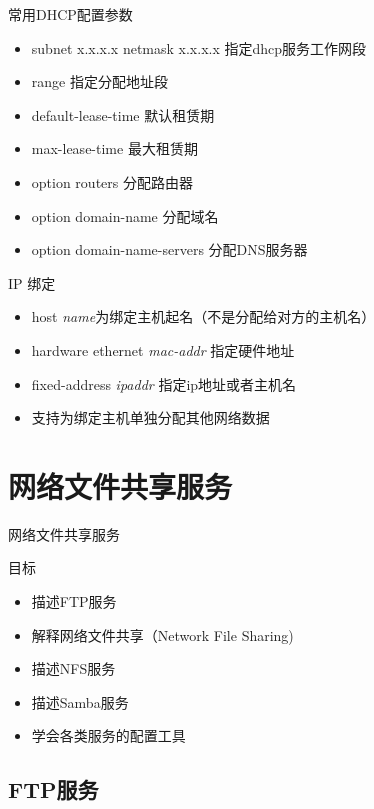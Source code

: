 \begin{frame}{常用DHCP配置参数}
\begin{itemize}
\item subnet x.x.x.x netmask x.x.x.x 指定dhcp服务工作网段
\item range 指定分配地址段
\item default-lease-time 默认租赁期
\item max-lease-time 最大租赁期
\item option routers 分配路由器
\item option domain-name 分配域名
\item option domain-name-servers 分配DNS服务器
\end{itemize}

\end{frame} 
\begin{frame}{IP 绑定}
\begin{itemize}
\item host \emph{name}为绑定主机起名（不是分配给对方的主机名）
\item hardware ethernet \emph{mac-addr }指定硬件地址
\item fixed-address \emph{ipaddr} 指定ip地址或者主机名
\item 支持为绑定主机单独分配其他网络数据
\end{itemize}

\end{frame} 
\section{网络文件共享服务}

\begin{frame}{网络文件共享服务}

目标
\begin{itemize}
\item 描述FTP服务
\item 解释网络文件共享（Network File Sharing)
\item 描述NFS服务
\item 描述Samba服务
\item 学会各类服务的配置工具
\end{itemize}

\end{frame} 
\subsection{FTP服务}

